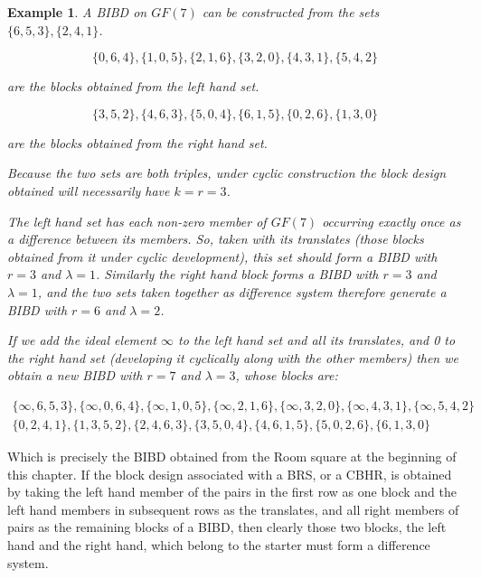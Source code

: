 \documentclass[
  11pt,
  a4paper]{book}
\newtheorem{example}{Example}
\begin{document}
\begin{example}
A BIBD on $GF(7)$ can be constructed from the sets
$\{6, 5, 3\}, \{2, 4, 1\}$.

\begin{equation}
\{0, 6, 4\}, \{1, 0, 5\}, \{2, 1, 6\}, \{3, 2, 0\}, \{4, 3, 1\}, \{5, 4, 2\}
\end{equation}

are the blocks obtained from the left hand set.

\begin{equation}
\{3, 5, 2\}, \{4, 6, 3\}, \{5, 0, 4\}, \{6, 1, 5\}, \{0, 2, 6\}, \{1, 3, 0\}
\end{equation}

are the blocks obtained from the right hand set.

Because the two sets are both triples, under cyclic
construction the block design obtained will necessarily have
$k = r = 3$.

The left hand set has each non-zero member of $GF(7)$
occurring exactly once as a difference between its members.
So, taken with its translates (those blocks obtained from it
under cyclic development), this set should form a BIBD with
$r = 3$ and $\lambda = 1$. Similarly the right hand block forms
a BIBD with $r = 3$ and $\lambda = 1$, and the two sets taken
together as difference system therefore generate a BIBD with
$r = 6$ and $\lambda = 2$.

If we add the ideal element $\infty$ to the left hand set
and all its translates, and 0 to the right hand set
(developing it cyclically along with the other members) then
we obtain a new BIBD with $r = 7$ and $\lambda = 3$, whose
blocks are:

\begin{equation}
\begin{split}
\{\infty,6,5,3\},\{\infty,0,6,4\},\{\infty,1,0,5\},\{\infty,2,1,6\},\{\infty,3,2,0\},\{\infty,4,3,1\},\{\infty,5,4,2\} \\
\{0,2,4,1\},\{1,3,5,2\},\{2,4,6,3\},\{3,5,0,4\},\{4,6,1,5\},\{5,0,2,6\},\{6,1,3,0\}
\end{split}
\end{equation}

\end{example}

Which is precisely the BIBD obtained from the Room square at
the beginning of this chapter. If the block design
associated with a BRS, or a CBHR, is obtained by taking the
left hand member of the pairs in the first row as one block
and the left hand members in subsequent rows as the
translates, and all right members of pairs as the remaining
blocks of a BIBD, then clearly those two blocks, the left
hand and the right hand, which belong to the starter must
form a difference system.
\end{document}
